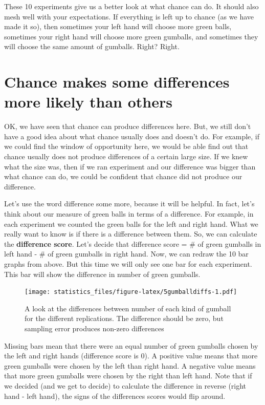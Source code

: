 \documentclass[]{book}
\begin{document}
These 10 experiments give us a better look at what chance can do. It should also mesh well with your expectations. If everything is left up to chance (as we have made it so), then sometimes your left hand will choose more green balls, sometimes your right hand will choose more green gumballs, and sometimes they will choose the same amount of gumballs. Right? Right.

\hypertarget{chance-makes-some-differences-more-likely-than-others}{%
\section{Chance makes some differences more likely than others}\label{chance-makes-some-differences-more-likely-than-others}}

OK, we have seen that chance can produce differences here. But, we still don't have a good idea about what chance usually does and doesn't do. For example, if we could find the window of opportunity here, we would be able find out that chance usually does not produce differences of a certain large size. If we knew what the size was, then if we ran experiment and our difference was bigger than what chance can do, we could be confident that chance did not produce our difference.

Let's use the word difference some more, because it will be helpful. In fact, let's think about our measure of green balls in terms of a difference. For example, in each experiment we counted the green balls for the left and right hand. What we really want to know is if there is a difference between them. So, we can calculate the \textbf{difference score}. Let's decide that difference score = \# of green gumballs in left hand - \# of green gumballs in right hand. Now, we can redraw the 10 bar graphs from above. But this time we will only see one bar for each experiment. This bar will show the difference in number of green gumballs.

\begin{figure}
\centering
\texttt{[image: statistics\_files/figure-latex/5gumballdiffs-1.pdf]}
\caption{\label{fig:5gumballdiffs}A look at the differences between number of each kind of gumball for the different replications. The difference should be zero, but sampling error produces non-zero differences}
\end{figure}

Missing bars mean that there were an equal number of green gumballs chosen by the left and right hands (difference score is 0). A positive value means that more green gumballs were chosen by the left than right hand. A negative value means that more green gumballs were chosen by the right than left hand. Note that if we decided (and we get to decide) to calculate the difference in reverse (right hand - left hand), the signs of the differences scores would flip around.
\end{document}
